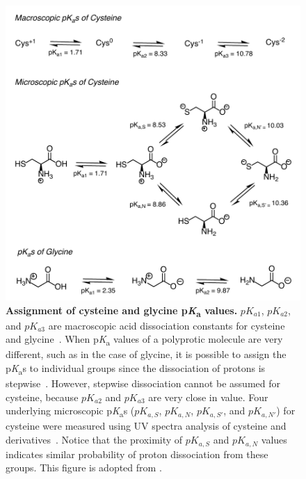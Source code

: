 \documentclass[9pt,lineno]{elife}
\newcommand{\pKa}{p\textit{K}\textsubscript{a}}
\begin{document}
\begin{figure}
\begin{center}
\includegraphics[width=0.65\linewidth]{figures/cysteine_vs_glycine_fig.pdf}
\caption{{\bf Assignment of cysteine and glycine \pKa{} values.}  $pK_{a1}$, $pK_{a2}$, and $pK_{a3}$ are macroscopic acid dissociation constants for cysteine and glycine~\citep{sober_handbook_1970}. 
When \pKa{} values of a polyprotic molecule are very different, such as in the case of glycine, it is possible to assign the \pKa{}s to individual groups since the dissociation of protons is stepwise~\citep{bodner_assigning_1986}. However, stepwise dissociation cannot be assumed for cysteine, because $pK_{a2}$ and $pK_{a3}$ are very close in value. Four underlying microscopic \pKa s ($pK_{a,S}$, $pK_{a,N}$, $pK_{a,S'}$, and $pK_{a,N'}$) for cysteine were measured using UV spectra analysis of cysteine and derivatives~\citep{doi:10.1021/ja01627a030}.
Notice that the proximity of $pK_{a,S}$ and $pK_{a,N}$ values indicates similar probability of proton dissociation from these groups. 
This figure is adopted from \citep{bodner_assigning_1986}. 
}
\label{fig:cys_vs_gly}
\end{center}
\end{figure}
\end{document}
